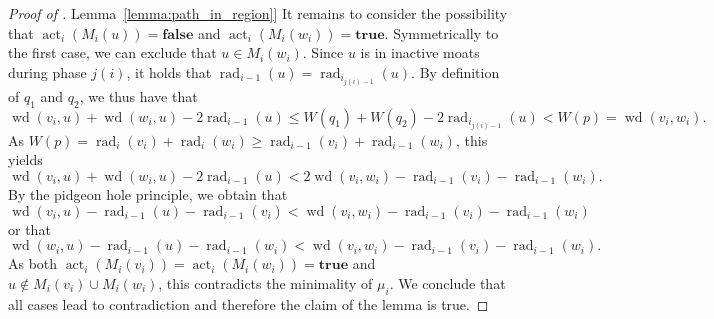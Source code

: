 \documentclass[letterpaper,11pt]{article}
\newcommand{\namedref}[2]{\hyperref[#2]{#1~\ref*{#2}}}
\newcommand{\lemmaref}[1]{\namedref{Lemma}{#1}}
\DeclareMathOperator{\act}{act}
\DeclareMathOperator{\moat}{rad}
\DeclareMathOperator{\Wd}{wd}
\newcommand{\true}{\mathbf{true}}
\newcommand{\false}{\mathbf{false}}
\begin{document}
\begin{proof}[Proof of \lemmaref{lemma:path_in_region}]
It remains to consider the possibility that $\act_i(M_i(u))=\false$ and
$\act_i(M_i(w_i))=\true$. Symmetrically to the first case, we can exclude that
$u\in M_i(w_i)$. Since $u$ is in inactive moats during phase $j(i)$, it holds that
$\moat_{i-1}(u)=\moat_{i_{j(i)-1}}(u)$. By definition of $q_1$ and $q_2$, we
thus have that
\begin{equation*}
\Wd(v_i,u)+\Wd(w_i,u)-2\moat_{i-1}(u)\leq W(q_1)+W(q_2)-2\moat_{i_{j(i)-1}}(u)
<W(p)=\Wd(v_i,w_i).
\end{equation*}
As $W(p)=\moat_i(v_i)+\moat_i(w_i)\geq \moat_{i-1}(v_i)+\moat_{i-1}(w_i)$, this
yields
\begin{equation*}
\Wd(v_i,u)+\Wd(w_i,u)-2\moat_{i-1}(u)<
2\Wd(v_i,w_i)-\moat_{i-1}(v_i)-\moat_{i-1}(w_i).
\end{equation*}
By the pidgeon hole principle, we obtain that
\begin{equation*}
\Wd(v_i,u)-\moat_{i-1}(u)-\moat_{i-1}(v_i)<
\Wd(v_i,w_i)-\moat_{i-1}(v_i)-\moat_{i-1}(w_i)
\end{equation*}
or that
\begin{equation*}
\Wd(w_i,u)-\moat_{i-1}(u)-\moat_{i-1}(w_i)<
\Wd(v_i,w_i)-\moat_{i-1}(v_i)-\moat_{i-1}(w_i).
\end{equation*}
As both $\act_i(M_i(v_i))=\act_i(M_i(w_i))=\true$ and $u\notin M_i(v_i)\cup
M_i(w_i)$, this contradicts the minimality of $\mu_i$. We conclude that all
cases lead to contradiction and therefore the claim of the lemma is true.
\end{proof}
\end{document}
